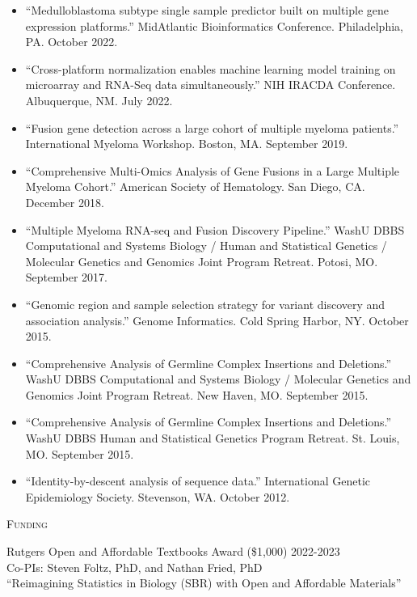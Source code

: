 \documentclass[11pt]{article}
\begin{document}
\begin{itemize}
  \item ``Medulloblastoma subtype single sample predictor built on multiple gene expression platforms.'' MidAtlantic Bioinformatics Conference. Philadelphia, PA. October 2022.
  \item ``Cross-platform normalization enables machine learning model training on microarray and RNA-Seq data simultaneously.'' NIH IRACDA Conference. Albuquerque, NM. July 2022.
	\item ``Fusion gene detection across a large cohort of multiple myeloma patients.'' International Myeloma Workshop. Boston, MA. September 2019.
	\item ``Comprehensive Multi-Omics Analysis of Gene Fusions in a Large Multiple Myeloma Cohort.'' American Society of Hematology. San Diego, CA. December 2018.
	\item ``Multiple Myeloma RNA-seq and Fusion Discovery Pipeline.'' WashU DBBS Computational and Systems Biology / Human and Statistical Genetics / Molecular Genetics and Genomics Joint Program Retreat. Potosi, MO. September 2017.
	\item ``Genomic region and sample selection strategy for variant discovery and association analysis.'' Genome Informatics. Cold Spring Harbor, NY. October 2015.
	\item  ``Comprehensive Analysis of Germline Complex Insertions and Deletions.'' WashU DBBS Computational and Systems Biology / Molecular Genetics and Genomics Joint Program Retreat. New Haven, MO. September 2015.
	\item  ``Comprehensive Analysis of Germline Complex Insertions and Deletions.'' WashU DBBS Human and Statistical Genetics Program Retreat. St. Louis, MO. September 2015.
	\item ``Identity-by-descent analysis of sequence data.'' International Genetic Epidemiology Society. Stevenson, WA. October 2012.
\end{itemize}

\hrulefill

\bigskip

\textsc{{\Large Funding}}

\bigskip

Rutgers Open and Affordable Textbooks Award (\$1,000) \hfill 2022-2023 \\
Co-PIs: Steven Foltz, PhD, and Nathan Fried, PhD \\
``Reimagining Statistics in Biology (SBR) with Open and Affordable Materials''
\end{document}
